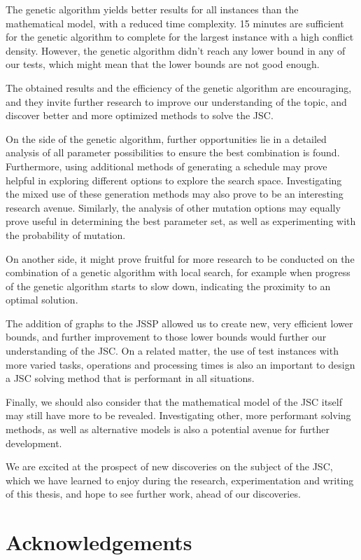 \documentclass{mimosis}
\begin{document}
The genetic algorithm yields better results for all instances than the mathematical model, with a reduced time complexity. 15 minutes are sufficient for the genetic algorithm to complete for the largest instance with a high conflict density. However, the genetic algorithm didn't reach any lower bound in any of our tests, which might mean that the lower bounds are not good enough.

The obtained results and the efficiency of the genetic algorithm are encouraging, and they invite further research to improve our understanding of the topic, and discover better and more optimized methods to solve the JSC.

On the side of the genetic algorithm, further opportunities lie in a detailed analysis of all parameter possibilities to ensure the best combination is found. Furthermore, using additional methods of generating a schedule may prove helpful in exploring different options to explore the search space. Investigating the mixed use of these generation methods may also prove to be an interesting research avenue. Similarly, the analysis of other mutation options may equally prove useful in determining the best parameter set, as well as experimenting with the probability of mutation.

On another side, it might prove fruitful for more research to be conducted on the combination of a genetic algorithm with local search, for example when progress of the genetic algorithm starts to slow down, indicating the proximity to an optimal solution.

The addition of graphs to the JSSP allowed us to create new, very efficient lower bounds, and further improvement to those lower bounds would further our understanding of the JSC. On a related matter, the use of test instances with more varied tasks, operations and processing times is also an important to design a JSC solving method that is performant in all situations.

Finally, we should also consider that the mathematical model of the JSC itself may still have more to be revealed. Investigating other, more performant solving methods, as well as alternative models is also a potential avenue for further development.

We are excited at the prospect of new discoveries on the subject of the JSC, which we have learned to enjoy during the research, experimentation and writing of this thesis, and hope to see further work, ahead of our discoveries.

\chapter*{Acknowledgements}
\end{document}
